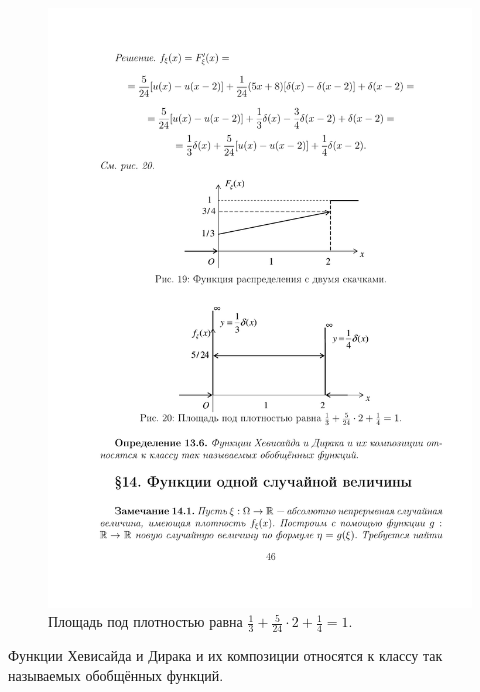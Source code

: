 \begin{figure}[H]
	\centering
	\includegraphics[]{pic/pic20}
	\caption{Площадь под плотностью равна 
				$\frac{1}{3}+\frac{5}{24}\cdot 2+\frac{1}{4}= 1$.}
	\label{fig20}
\end{figure}

\begin{definition}
\label{def:13.6}
	Функции Хевисайда и Дирака и их композиции относятся к классу так называемых обобщённых функций.
\end{definition}